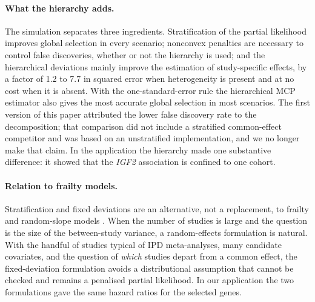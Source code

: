 \documentclass[11pt]{article}
\theoremstyle{remark}
\numberwithin{equation}{section}
\begin{document}
\paragraph{What the hierarchy adds.} The simulation separates three
ingredients. Stratification of the partial likelihood improves global selection in
every scenario; nonconvex penalties are necessary to control false discoveries,
whether or not the hierarchy is used; and the hierarchical deviations mainly improve
the estimation of study-specific effects, by a factor of 1.2 to 7.7 in squared error
when heterogeneity is present and at no cost when it is absent. With the
one-standard-error rule the hierarchical MCP estimator also gives the most accurate
global selection in most scenarios. The first version of this paper attributed the
lower false discovery rate to the decomposition; that comparison did not include a
stratified common-effect competitor and was based on an unstratified implementation,
and we no longer make that claim. In the application the hierarchy made one
substantive difference: it showed that the \textit{IGF2} association is confined to
one cohort.

\paragraph{Relation to frailty models.} Stratification and fixed deviations are an
alternative, not a replacement, to frailty and random-slope models
\citep{VaidaXu2000, RipattiPalmgren2000, Groll2017, Utazirubanda2021}. When the
number of studies is large and the question is the size of the between-study
variance, a random-effects formulation is natural. With the handful of studies
typical of IPD meta-analyses, many candidate covariates, and the question of
\emph{which} studies depart from a common effect, the fixed-deviation formulation
avoids a distributional assumption that cannot be checked and remains a penalised
partial likelihood. In our application the two formulations gave the same hazard
ratios for the selected genes.
\end{document}
